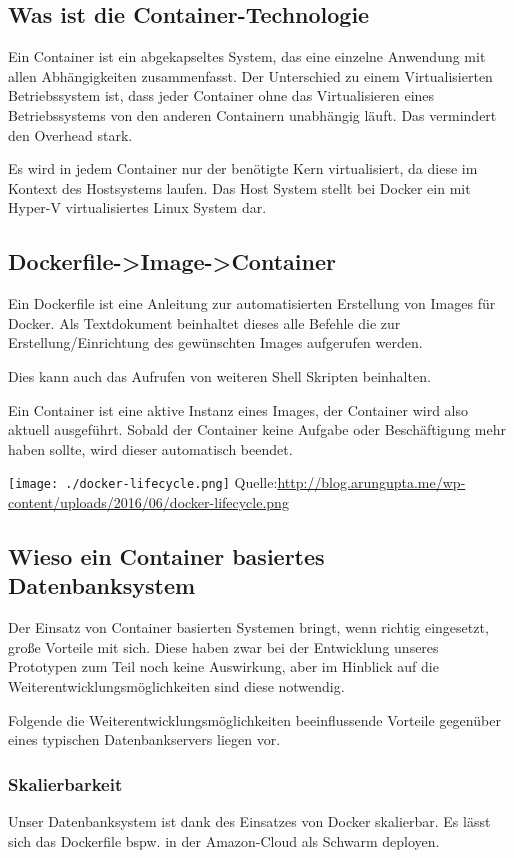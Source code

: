 \documentclass{sigchi}
\begin{document}
\subsection{Was ist die Container-Technologie}
Ein Container ist ein abgekapseltes System, das eine einzelne Anwendung mit allen Abhängigkeiten zusammenfasst. Der Unterschied zu einem Virtualisierten Betriebssystem ist, dass jeder Container ohne das Virtualisieren eines Betriebssystems von den anderen Containern unabhängig läuft. Das vermindert den Overhead stark.

Es wird in jedem Container nur der benötigte Kern virtualisiert, da diese im Kontext des Hostsystems laufen. Das Host System stellt bei Docker ein mit Hyper-V virtualisiertes Linux System dar.

\subsection{Dockerfile->Image->Container}
Ein Dockerfile ist eine Anleitung zur automatisierten Erstellung von Images für Docker. Als Textdokument beinhaltet dieses alle Befehle die zur Erstellung/Einrichtung des gewünschten Images aufgerufen werden.

Dies kann auch das Aufrufen von weiteren Shell Skripten beinhalten.

Ein Container ist eine aktive Instanz eines Images, der Container wird also aktuell ausgeführt. Sobald der Container keine Aufgabe oder Beschäftigung mehr haben sollte, wird dieser automatisch beendet.


\texttt{[image: ./docker-lifecycle.png]}
Quelle:\url{http://blog.arungupta.me/wp-content/uploads/2016/06/docker-lifecycle.png}

\subsection{Wieso ein Container basiertes Datenbanksystem}
Der Einsatz von Container basierten Systemen bringt, wenn richtig eingesetzt, große Vorteile mit sich. Diese haben zwar bei der Entwicklung unseres Prototypen zum Teil noch keine Auswirkung, aber im Hinblick auf die Weiterentwicklungsmöglichkeiten sind diese notwendig.

Folgende die Weiterentwicklungsmöglichkeiten beeinflussende Vorteile gegenüber eines typischen Datenbankservers liegen vor.

\subsubsection{Skalierbarkeit}
Unser Datenbanksystem ist dank des Einsatzes von Docker skalierbar.
Es lässt sich das Dockerfile bspw. in der Amazon-Cloud als Schwarm deployen.
\end{document}

